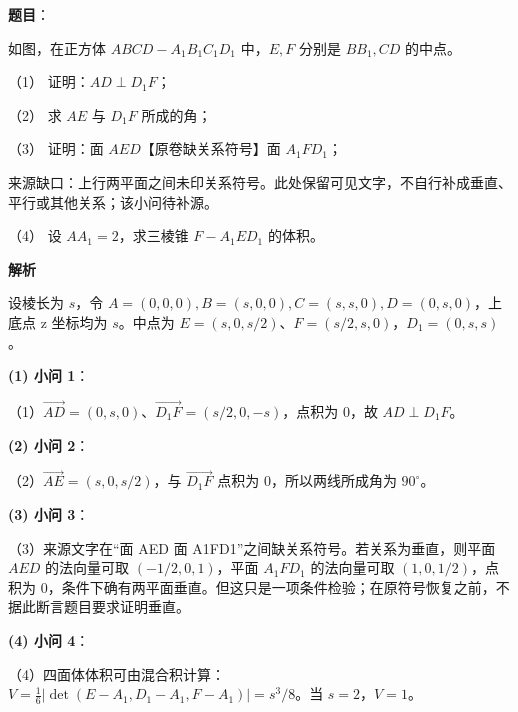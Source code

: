 \begin{answer}

\textbf{题目}：

如图，在正方体 $ABCD-A_1B_1C_1D_1$ 中，$E,F$ 分别是 $BB_1,CD$ 的中点。

（1） 证明：$AD\perp D_1F$；

（2） 求 $AE$ 与 $D_1F$ 所成的角；

（3） 证明：面 $AED$【原卷缺关系符号】面 $A_1FD_1$；

\begin{gktip}
来源缺口：上行两平面之间未印关系符号。此处保留可见文字，不自行补成垂直、平行或其他关系；该小问待补源。
\end{gktip}

（4） 设 $AA_1=2$，求三棱锥 $F-A_1ED_1$ 的体积。
\nopagebreak[4]
\begin{center}\end{center}
\nopagebreak[4]
\textbf{解析}

设棱长为 $s$，令 $A=(0,0,0),B=(s,0,0),C=(s,s,0),D=(0,s,0)$，上底点 z 坐标均为 $s$。中点为 $E=(s,0,s/2)$、$F=(s/2,s,0)$，$D_1=(0,s,s)$。

\textbf{(1) 小问 1}：

（1）$\overrightarrow{AD}=(0,s,0)$、$\overrightarrow{D_1F}=(s/2,0,-s)$，点积为 0，故 $AD\perp D_1F$。

\textbf{(2) 小问 2}：

（2）$\overrightarrow{AE}=(s,0,s/2)$，与 $\overrightarrow{D_1F}$ 点积为 0，所以两线所成角为 $90^\circ$。

\textbf{(3) 小问 3}：

（3）来源文字在“面 AED 面 A1FD1”之间缺关系符号。若关系为垂直，则平面 $AED$ 的法向量可取 $(-1/2,0,1)$，平面 $A_1FD_1$ 的法向量可取 $(1,0,1/2)$，点积为 0，条件下确有两平面垂直。但这只是一项条件检验；在原符号恢复之前，不据此断言题目要求证明垂直。

\textbf{(4) 小问 4}：

（4）四面体体积可由混合积计算：$V=\frac16|\det(E-A_1,D_1-A_1,F-A_1)|=s^3/8$。当 $s=2$，$V=1$。





\end{answer}
